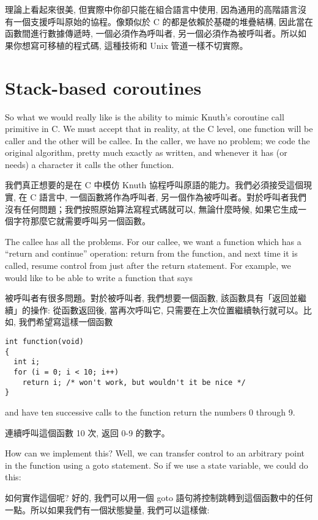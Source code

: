 \documentclass[12pt]{article}
\begin{document}
\begin{CJK}{UTF8}{bsmi}
理論上看起來很美, 但實際中你卻只能在組合語言中使用, 因為通用的高階語言沒有一個支援呼叫原始的協程。像類似於 C 的都是依賴於基礎的堆疊結構, 因此當在函數間進行數據傳遞時, 一個必須作為呼叫者, 另一個必須作為被呼叫者。所以如果你想寫可移植的程式碼, 這種技術和 Unix 管道一樣不切實際。

\section{Stack-based coroutines}

So what we would really like is the ability to mimic Knuth's coroutine call primitive in C. We must accept that in reality, at the C level, one function will be caller and the other will be callee. In the caller, we have no problem; we code the original algorithm, pretty much exactly as written, and whenever it has (or needs) a character it calls the other function.

我們真正想要的是在 C 中模仿 Knuth 協程呼叫原語的能力。我們必須接受這個現實, 在 C 語言中, 一個函數將作為呼叫者, 另一個作為被呼叫者。對於呼叫者我們沒有任何問題；我們按照原始算法寫程式碼就可以, 無論什麼時候, 如果它生成一個字符那麼它就需要呼叫另一個函數。

The callee has all the problems. For our callee, we want a function which has a ``return and continue'' operation: return from the function, and next time it is called, resume control from just after the return statement. For example, we would like to be able to write a function that says


 被呼叫者有很多問題。對於被呼叫者, 我們想要一個函數, 該函數具有「返回並繼續」的操作: 從函數返回後, 當再次呼叫它, 只需要在上次位置繼續執行就可以。比如, 我們希望寫這樣一個函數 

\begin{lstlisting}[basicstyle=\footnotesize, breaklines=true]
int function(void) 
{
  int i;
  for (i = 0; i < 10; i++)
    return i; /* won't work, but wouldn't it be nice */
}
\end{lstlisting}

and have ten successive calls to the function return the numbers 0 through 9.

連續呼叫這個函數 10 次, 返回 0-9 的數字。 

How can we implement this? Well, we can transfer control to an arbitrary point in the function using a goto statement. So if we use a state variable, we could do this:

如何實作這個呢? 好的, 我們可以用一個 goto 語句將控制跳轉到這個函數中的任何一點。所以如果我們有一個狀態變量, 我們可以這樣做:


\end{CJK}
\end{document}
